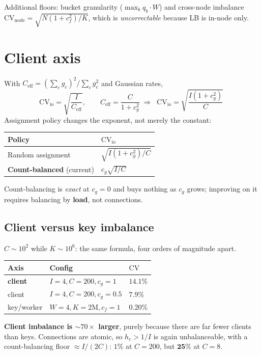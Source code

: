 \documentclass[11pt]{article}
\begin{document}
Additional floors: bucket granularity ($\max_b q_b\cdot W$) and cross-node imbalance
$\mathrm{CV}_{\text{node}}=\sqrt{N(1+c_f^2)/K}$, which is \emph{uncorrectable} because LB is
in-node only.

\section{Client axis}
With $C_{\mathrm{eff}}=(\sum_c g_c)^2/\sum_c g_c^2$ and Gaussian rates,
\[
\mathrm{CV}_{\mathrm{io}}=\sqrt{\frac{I}{C_{\mathrm{eff}}}},\qquad
C_{\mathrm{eff}}=\frac{C}{1+c_g^2}
\;\Longrightarrow\;
\boxed{\;\mathrm{CV}_{\mathrm{io}}=\sqrt{\frac{I(1+c_g^2)}{C}}\;}
\]
Assignment policy changes the exponent, not merely the constant:
\begin{center}
\begin{tabular}{ll}
\toprule
Policy & $\mathrm{CV}_{\mathrm{io}}$ \\
\midrule
Random assignment & $\sqrt{I(1+c_g^2)/C}$ \\
\textbf{Count-balanced} (current) & $c_g\sqrt{I/C}$ \\
\bottomrule
\end{tabular}
\end{center}
Count-balancing is \emph{exact} at $c_g=0$ and buys nothing as $c_g$ grows; improving on it
requires balancing by \textbf{load}, not connections.

\subsection{Client versus key imbalance}
$C\sim10^2$ while $K\sim10^6$: the same formula, four orders of magnitude apart.
\begin{center}
\begin{tabular}{lll}
\toprule
Axis & Config & $\mathrm{CV}$ \\
\midrule
\textbf{client} & $I=4,C=200,c_g=1$ & $\mathbf{14.1\%}$ \\
client & $I=4,C=200,c_g=0.5$ & $7.9\%$ \\
key/worker & $W=4,K=2\mathrm{M},c_f=1$ & $\mathbf{0.20\%}$ \\
\bottomrule
\end{tabular}
\end{center}
\textbf{Client imbalance is $\sim70\times$ larger}, purely because there are far fewer clients
than keys. Connections are atomic, so $h_c>1/I$ is again unbalanceable, with a count-balancing
floor $\approx I/(2C)$: $1\%$ at $C=200$, but $\mathbf{25\%}$ at $C=8$.
\end{document}
